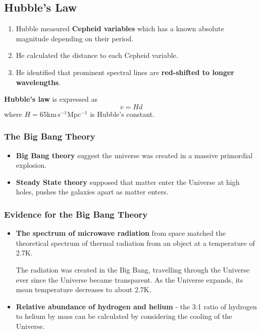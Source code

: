 \subsection{Hubble's Law}

\begin{enumerate}
    \item Hubble measured \textbf{Cepheid variables} which has a known absolute magnitude depending on their period.
    \item He calculated the distance to each Cepheid variable.
    \item He identified that prominent spectral lines are \textbf{red-shifted to longer wavelengths}.
\end{enumerate}

\textbf{Hubble's law} is expressed as
$$v=Hd$$
where $H=65$km\,s$^{-1}$Mpc$^{-1}$ is Hubble's constant.

\subsubsection*{The Big Bang Theory}
\begin{itemize}
    \item \textbf{Big Bang theory} suggest the universe was created in a massive primordial explosion.
    \item \textbf{Steady State theory} supposed that matter enter the Universe at high holes, pushes the galaxies apart as matter enters.
\end{itemize}

\subsubsection*{Evidence for the Big Bang Theory}

\begin{itemize}
    \item \textbf{The spectrum of microwave radiation} from space matched the theoretical spectrum of thermal radiation from an object at a temperature of 2.7K.

        The radiation was created in the Big Bang, travelling through the Universe ever since the Universe became transparent. As the Universe expands, its mean temperature decreases to about 2.7K.
    \item \textbf{Relative abundance of hydrogen and helium} - the 3:1 ratio of hydrogen to helium by mass can be calculated by considering the cooling of the Universe.
\end{itemize}

